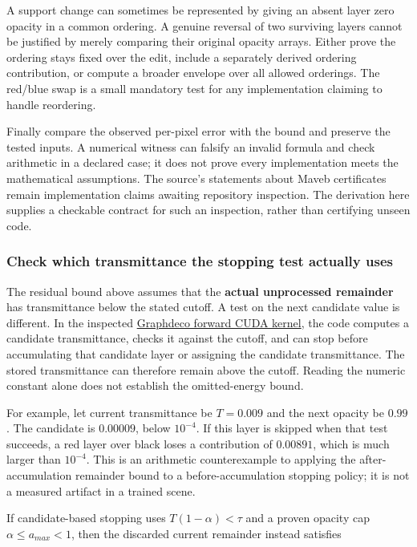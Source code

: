 A support change can sometimes be represented by giving an absent layer zero opacity in a common ordering. A genuine reversal of two surviving layers cannot be justified by merely comparing their original opacity arrays. Either prove the ordering stays fixed over the edit, include a separately derived ordering contribution, or compute a broader envelope over all allowed orderings. The red/blue swap is a small mandatory test for any implementation claiming to handle reordering.

Finally compare the observed per-pixel error with the bound and preserve the tested inputs. A numerical witness can falsify an invalid formula and check arithmetic in a declared case; it does not prove every implementation meets the mathematical assumptions. The source's statements about Maveb certificates remain implementation claims awaiting repository inspection. The derivation here supplies a checkable contract for such an inspection, rather than certifying unseen code.

\subsubsection{Check which transmittance the stopping test actually uses}\label{06-engine-ii-ch045-check-which-transmittance-the-stopping-test-actually-uses}

The residual bound above assumes that the \textbf{actual unprocessed remainder} has transmittance below the stated cutoff. A test on the next candidate value is different. In the inspected \href{https://github.com/graphdeco-inria/diff-gaussian-rasterization/blob/main/cuda_rasterizer/forward.cu}{Graphdeco forward CUDA kernel}, the code computes a candidate transmittance, checks it against the cutoff, and can stop before accumulating that candidate layer or assigning the candidate transmittance. The stored transmittance can therefore remain above the cutoff. Reading the numeric constant alone does not establish the omitted-energy bound.

For example, let current transmittance be \(T=0.009\) and the next opacity be \(0.99\). The candidate is \(0.00009\), below \(10^{-4}\). If this layer is skipped when that test succeeds, a red layer over black loses a contribution of \(0.00891\), which is much larger than \(10^{-4}\). This is an arithmetic counterexample to applying the after-accumulation remainder bound to a before-accumulation stopping policy; it is not a measured artifact in a trained scene.

If candidate-based stopping uses \(T(1-\alpha)<\tau\) and a proven opacity cap \(\alpha\le a_{max}<1\), then the discarded current remainder instead satisfies

